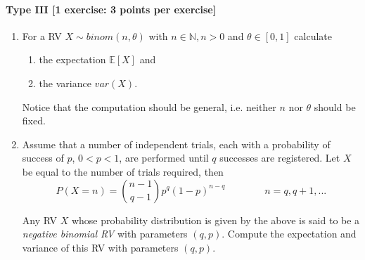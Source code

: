 \documentclass{article}
\newcommand{\E}{\mathbb{E}}
\begin{document}
	\paragraph{Type III [1 exercise: 3 points per exercise]}
\begin{enumerate}
\item For a RV $ X \sim binom(n,\theta) $ with $ n \in \mathbb{N}, n > 0 $ and $ \theta \in [0,1] $ calculate
	\begin{enumerate}
		\item the expectation $ \E[X] $ and
		\item the variance $ var(X) $.
	\end{enumerate}
	Notice that the computation should be general, i.e. neither $ n $ nor $ \theta $ should be fixed.
\item Assume that a number of independent trials, each with a probability of success of $p$, $0 < p < 1$, are performed until $q$ successes are registered. Let $X$ be equal to the number of trials required, then
	$$P(X = n) = \binom{n-1}{q-1} p^{q} (1 - p)^{n-q} \qquad \qquad n = q, q+1, ...$$

	Any RV $X$ whose probability distribution is given by the above is said to be a {\em negative binomial RV} with parameters $(q,p)$. Compute the expectation and variance of this RV with parameters $(q,p)$.
\end{enumerate}
\end{document}
